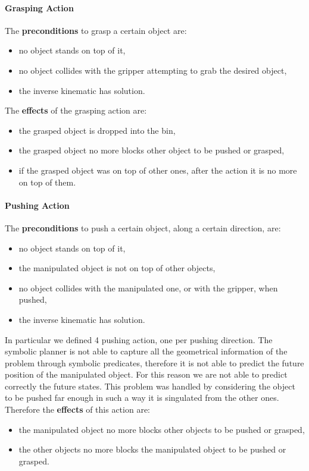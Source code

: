 \paragraph{Grasping Action}
The \textbf{preconditions} to grasp a certain object are:
\begin{itemize}
\item no object stands on top of it,
\item no object collides with the gripper attempting to grab the desired object,
\item the inverse kinematic has solution.
\end{itemize}
The \textbf{effects} of the grasping action are:
\begin{itemize}
\item the grasped object is dropped into the bin,
\item the grasped object no more blocks other object to be pushed or grasped,
\item if the grasped object was on top of other ones, after the action it is no more on top of them.
\end{itemize}  

\paragraph{Pushing Action}
The \textbf{preconditions} to push a certain object, along a certain direction, are:
\begin{itemize}
\item no object stands on top of it,
\item the manipulated object is not on top of other objects,
\item no object collides with the manipulated one, or with the gripper, when pushed,
\item the inverse kinematic has solution.
\end{itemize}
In particular we defined 4 pushing action, one per pushing direction. 
The symbolic planner is not able to capture all the geometrical information of the problem through symbolic predicates, therefore it is not able to predict the future position of the manipulated object. For this reason we are not able to predict correctly the future states. This problem was handled by considering the object to be pushed far enough in such a way it is singulated from the other ones.  
Therefore the \textbf{effects} of this action are:
\begin{itemize}
\item the manipulated object no more blocks other objects to be pushed or grasped,
\item the other objects no more blocks the manipulated object to be pushed or grasped.
\end{itemize}  

